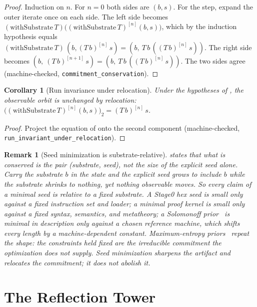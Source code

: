 \documentclass[11pt,a4paper]{article}
\newtheorem{corollary}[theorem]{Corollary}
\newtheorem{remark}[theorem]{Remark}
\begin{document}
\begin{proof}
Induction on $n$.
For $n = 0$ both sides are $(b, s)$.
For the step, expand the outer iterate once on each side.
The left side becomes
$(\mathrm{withSubstrate}\,T)\big((\mathrm{withSubstrate}\,T)^{[n]}(b,s)\big)$,
which by the induction hypothesis equals
$(\mathrm{withSubstrate}\,T)\,(b, (T\,b)^{[n]}\,s)
 = (b,\ T\,b\,((T\,b)^{[n]}\,s))$.
The right side becomes $(b,\ (T\,b)^{[n+1]}\,s)
 = (b,\ T\,b\,((T\,b)^{[n]}\,s))$.
The two sides agree
(machine-checked, \texttt{commitment\_conservation}).
\end{proof}

\begin{corollary}[Run invariance under relocation]
\label{cor:relocation}
Under the hypotheses of , the observable orbit is
unchanged by relocation:
$\big((\mathrm{withSubstrate}\,T)^{[n]}(b, s)\big)_2 = (T\,b)^{[n]}\,s$.
\end{corollary}

\begin{proof}
Project the equation of  onto the second component
(machine-checked, \texttt{run\_invariant\_under\_relocation}).
\end{proof}

\begin{remark}[Seed minimization is substrate-relative]
\label{rem:minimization}
 states that what is conserved is the pair
(substrate, seed), not the size of the explicit seed alone.
Carry the substrate $b$ in the state and the explicit seed grows to include $b$
while the substrate shrinks to nothing, yet nothing observable moves.
So every claim of a minimal seed is relative to a fixed substrate.
A Stage0 hex seed is small only against a fixed instruction set and loader;
a minimal proof kernel is small only against a fixed syntax, semantics, and
metatheory; a Solomonoff prior~\cite{solomonoff1964} is minimal in description
only against a chosen reference machine, which shifts every length by a
machine-dependent constant.
Maximum-entropy priors~\cite{jaynes2003} repeat the shape: the constraints held
fixed are the irreducible commitment the optimization does not supply.
Seed minimization sharpens the artifact and relocates the commitment; it does
not abolish it.
\end{remark}

\section{The Reflection Tower}
\label{sec:reflection}
\end{document}
